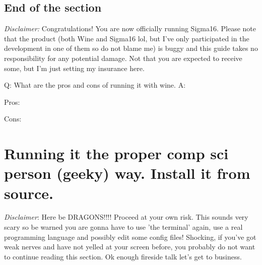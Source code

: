 \documentclass{article}
\begin{document}
\subsection{End of the section}
 \textit{Disclaimer:}
 Congratulations! You are now officially running Sigma16. Please note that the product (both Wine and Sigma16 lol, but I've only participated in the development in one of them so do not blame me) is buggy and this guide takes no responsibility for any potential damage. Not that you are expected to receive some, but I'm just setting my insurance here.

Q: What are the pros and cons of running it with wine.
A:

 Pros:


 Cons:


\section{Running it the proper comp sci person (geeky) way. Install it from source.}
\textit{Disclaimer}:
 Here be DRAGONS!!!! Proceed at your own risk. This sounds very scary so be warned you are gonna have to use 'the terminal' again, use a real programming language and possibly edit some config files! Shocking, if you've got weak nerves and have not yelled at your screen before, you probably do not want to continue reading this section. Ok enough fireside talk let's get to business.
\end{document}
